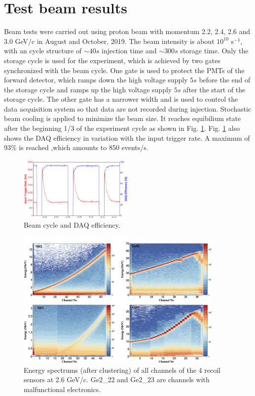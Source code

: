 \documentclass[number,5p]{elsarticle}
\begin{document}
\section{Test beam results}
\label{sec:result}

Beam tests were carried out using proton beam with momentum 2.2, 2.4, 2.6 and
3.0 GeV/c in August and October, 2019.
The beam intensity is about $10^{10}$ s$^{-1}$, with an cycle structure of
$\sim40 s$ injection time and $\sim300 s$ storage time.
Only the storage cycle is used for the experiment, which is achieved by two
gates synchronized with the beam cycle.
One gate is used to protect the PMTs of the forward detector, which ramps down the high voltage supply $5s$ before the end of the
storage cycle and ramps up the high voltage supply $5s$ after the start of the storage cycle.
The other gate has a narrower width and is used to control the data
acquisition system so that data are not recorded during injection.
Stochastic beam cooling is applied to minimize the beam size. It reaches
equibilium state after the beginning 1/3 of the experiment cycle as shown in Fig. \ref{fig:beam}.
Fig. \ref{fig:beam} also shows the DAQ efficiency in variation with the input trigger rate.
A maximum of 93\% is reached ,which amounts to 850 events/s.

\begin{figure}[htbp]
  \centering
  \includegraphics[width=0.5\textwidth]{./daq_efficiency.png}
  \caption{Beam cycle and DAQ efficiency.}
  \label{fig:beam}
\end{figure}

\begin{figure}[tbp]
  \centering
  \includegraphics[width=0.9\textwidth]{./e_map.png}
  \caption{Energy spectrums (after clustering) of all channels of the 4 recoil
    sensors at 2.6 GeV/c. Ge2\_22 and Ge2\_23 are channels with malfunctional electronics.}
  \label{fig:e_map}
\end{figure}
\end{document}
